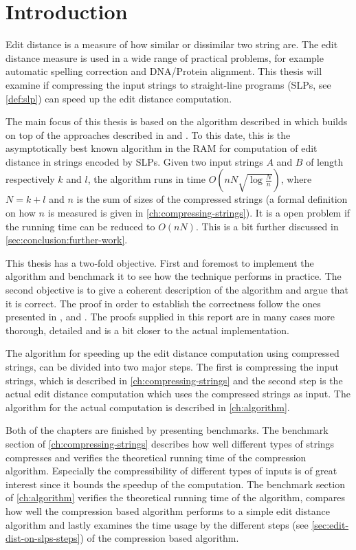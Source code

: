 \documentclass[twoside,11pt,openright]{report}
\begin{document}
\chapter{Introduction}
\label{ch:intro}
Edit distance is a measure of how similar or dissimilar two string are. The edit distance measure is used in a wide range of practical problems, for example automatic spelling correction and DNA/Protein alignment. This thesis will examine if compressing the input strings to straight-line programs (SLPs, see \cref{def:slp}) can speed up the edit distance computation.

The main focus of this thesis is based on the algorithm described in \cite{Gawrychowski:2012:FAC:2422024.2422048} which builds on top of the approaches described in \cite{DBLP:journals/corr/abs-1004-1194} and \cite{DBLP:journals/corr/abs-0707-3619}. To this date, this is the asymptotically best known algorithm in the RAM for computation of edit distance in strings encoded by SLPs. Given two input strings $A$ and $B$ of length respectively $k$ and $l$, the algorithm runs in time $O(n N \sqrt{\log{\frac{N}{n}}})$, where $N = k + l$ and $n$ is the sum of sizes of the compressed strings (a formal definition on how $n$ is measured is given in \cref{ch:compressing-strings}). It is a open problem if the running time can be reduced to $O(nN)$. This is a bit further discussed in \cref{sec:conclusion:further-work}.

This thesis has a two-fold objective. First and foremost to implement the algorithm and benchmark it to see how the technique performs in practice. The second objective is to give a coherent description of the algorithm and argue that it is correct. The proof in order to establish the correctness follow the ones presented in \cite{DBLP:journals/corr/abs-0707-3619}, \cite{Gawrychowski:2012:FAC:2422024.2422048} and \cite{Tiskin:2010:FDM:1873601.1873704}. The proofs supplied in this report are in many cases more thorough, detailed and is a bit closer to the actual implementation.

The algorithm for speeding up the edit distance computation using compressed strings, can be divided into two major steps. The first is compressing the input strings, which is described in \cref{ch:compressing-strings} and the second step is the actual edit distance computation which uses the compressed strings as input. The algorithm for the actual computation is described in \cref{ch:algorithm}.

Both of the chapters are finished by presenting benchmarks. The benchmark section of \cref{ch:compressing-strings} describes how well different types of strings compresses and verifies the theoretical running time of the compression algorithm. Especially the compressibility of different types of inputs is of great interest since it bounds the speedup of the computation. The benchmark section of \cref{ch:algorithm} verifies the theoretical running time of the algorithm, compares how well the compression based algorithm performs to a simple edit distance algorithm and lastly examines the time usage by the different steps (see \cref{sec:edit-dist-on-slps-steps}) of the compression based algorithm.
\end{document}

